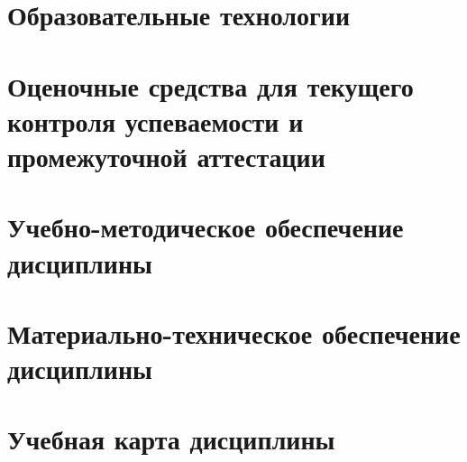 



\section{Образовательные технологии}

\section{Оценочные средства для текущего контроля успеваемости и промежуточной аттестации}

\section{Учебно-методическое обеспечение дисциплины}





\section{Материально-техническое обеспечение дисциплины}
	



\section{Учебная карта дисциплины}

